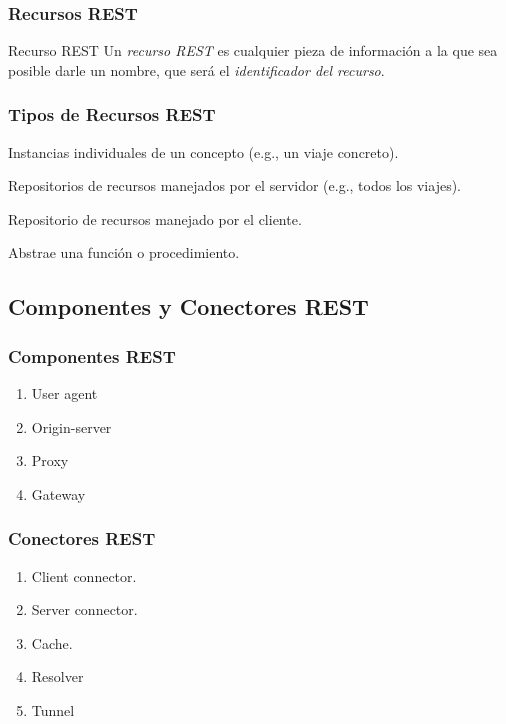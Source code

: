 \documentclass[a4paper,slidestop,xcolor=pst,blue]{beamer}
\begin{document}
\begin{frame}[c]
	\frametitle{Recursos REST}
    \begin{block}{Recurso REST}
        Un \emph{recurso REST} es cualquier pieza de información a la que sea posible darle un nombre, que será el \emph{identificador del recurso}.
    \end{block}
\end{frame}

\begin{frame}[c]
    \frametitle{Tipos de Recursos REST}
    \begin{description}[<+->]
        \item[Documentos] Instancias individuales de un concepto (e.g., un viaje concreto).
        \item[Colecciones] Repositorios de recursos manejados por el servidor (e.g., todos los viajes).
        \item[Store] Repositorio de recursos manejado por el cliente.
        \item[Controller] Abstrae una función o procedimiento.
    \end{description}
\end{frame}

\subsection{Componentes y Conectores REST}

\begin{frame}[c]
    \frametitle{Componentes REST}
    \begin{enumerate}[<+->]
        \item User agent
        \item Origin-server
        \item Proxy
        \item Gateway
    \end{enumerate}
\end{frame}

\begin{frame}[c]
    \frametitle{Conectores REST}
    \begin{enumerate}[<+->]
        \item Client connector.
        \item Server connector.
        \item Cache.
        \item Resolver
        \item Tunnel
    \end{enumerate}

\end{frame}
\end{document}
